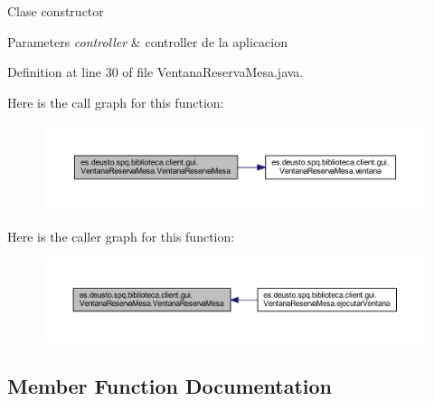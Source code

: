 Clase constructor 
\begin{DoxyParams}{Parameters}
{\em controller} & controller de la aplicacion \\
\hline
\end{DoxyParams}


Definition at line 30 of file Ventana\+Reserva\+Mesa.\+java.

Here is the call graph for this function\+:
\nopagebreak
\begin{figure}[H]
\begin{center}
\leavevmode
\includegraphics[width=350pt]{classes_1_1deusto_1_1spq_1_1biblioteca_1_1client_1_1gui_1_1_ventana_reserva_mesa_a07af3780e061e9b4982c0efff9d541a3_cgraph}
\end{center}
\end{figure}
Here is the caller graph for this function\+:
\nopagebreak
\begin{figure}[H]
\begin{center}
\leavevmode
\includegraphics[width=350pt]{classes_1_1deusto_1_1spq_1_1biblioteca_1_1client_1_1gui_1_1_ventana_reserva_mesa_a07af3780e061e9b4982c0efff9d541a3_icgraph}
\end{center}
\end{figure}


\subsection{Member Function Documentation}
\mbox{\label{classes_1_1deusto_1_1spq_1_1biblioteca_1_1client_1_1gui_1_1_ventana_reserva_mesa_ae2adaaebc76093cbdf64c2f859bc44d8}} 
